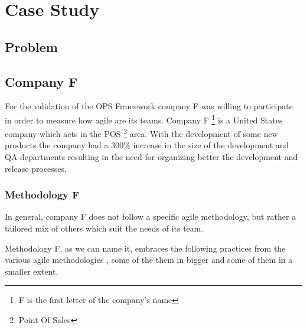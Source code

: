 \chapter{Case Study}\label{ch:case study}


\section{Problem}

\section{Company F}
For the validation of the OPS Framework company F was willing to participate in order to measure how agile are its teams. Company F \footnote{F is the first letter of the company's name} is a United States company which acts in the POS \footnote{Point Of Sales} area. With the development of some new products the company had a 300\% increase in the size of the development and QA departments resulting in the need for organizing better the development and release processes.

\subsection{Methodology F}
In general, company F does not follow a specific agile methodology, but rather a tailored mix of others which suit the needs of its team. 

Methodology F, as we can name it, embraces the following practices from the various agile methodologies \cite{koch2005agile}, some of the them in bigger and some of them in a smaller extent. \\

